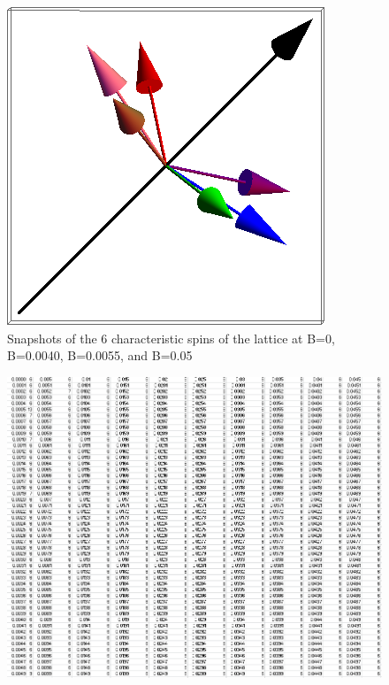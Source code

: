 \documentclass{article}
\begin{document}
\begin{figure}[ht]
\includegraphics[scale=0.32]{111_3000/501S000to005G.png}
\caption{Snapshots of the 6 characteristic spins of the lattice at B=0, B=0.0040, B=0.0055, and B=0.05}
\end{figure}
\clearpage

\begin{center}
 \begin{figure}
 \centering
 \includegraphics[keepaspectratio,scale=0.7]{111_3000/000to005SpinChart.png}  
 \end{figure}
 \end{center}
\clearpage
\end{document}
